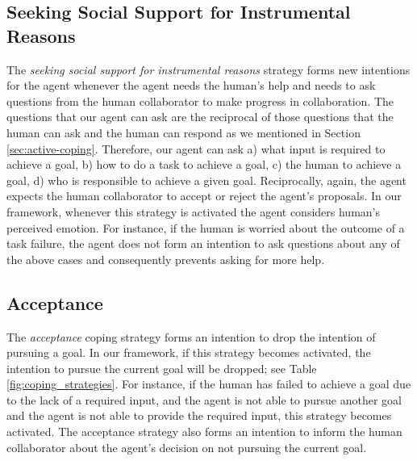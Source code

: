 \documentclass[12pt]{report}
\begin{document}
\subsection{Seeking Social Support for Instrumental Reasons}
The \textit{seeking social support for instrumental reasons} strategy forms new
intentions for the agent whenever the agent needs the human's help and needs to
ask questions from the human collaborator to make progress in collaboration. The
questions that our agent can ask are the reciprocal of those questions that the
human can ask and the human can respond as we mentioned in Section
\ref{sec:active-coping}. Therefore, our agent can ask a) what input is required
to achieve a goal, b) how to do a task to achieve a goal, c) the human to
achieve a goal, d) who is responsible to achieve a given goal. Reciprocally,
again, the agent expects the human collaborator to accept or reject the agent's
proposals. In our framework, whenever this strategy is activated the agent
considers human's perceived emotion. For instance, if the human is worried about
the outcome of a task failure, the agent does not form an intention to ask
questions about any of the above cases and consequently prevents asking for more
help.

\subsection{Acceptance}
The \textit{acceptance} coping strategy forms an intention to drop the
intention of pursuing a goal. In our framework, if this strategy becomes
activated, the intention to pursue the current goal will be dropped; see Table
\ref{fig:coping_strategies}. {\color{red}For instance, if the human has failed
to achieve a goal due to the lack of a required input, and the agent is not able to pursue
another goal and the agent is not able to provide the required input, this
strategy becomes activated.} The acceptance strategy also forms an intention to
inform the human collaborator about the agent's decision on not pursuing the
current goal.
\end{document}
